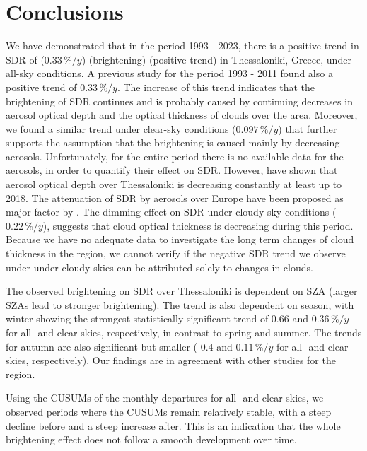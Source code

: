 \documentclass[applsci,article,submit,moreauthors,pdftex]{Definitions/mdpi}
\begin{document}
\hypertarget{conclusions}{%
\section{Conclusions}\label{conclusions}}

We have demonstrated that in the period 1993 - 2023, there is a positive
trend in SDR of (\(0.33\,\%/y\)) (brightening) (positive trend) in
Thessaloniki, Greece, under all-sky conditions. A previous study
\citep{Bais2013} for the period 1993 - 2011 found also a positive trend
of \(0.33\,\%/y\). The increase of this trend indicates that the
brightening of SDR continues and is probably caused by continuing
decreases in aerosol optical depth and the optical thickness of clouds
over the area. Moreover, we found a similar trend under clear-sky
conditions (\(0.097\,\%/y\)) that further supports the assumption that
the brightening is caused mainly by decreasing aerosols. Unfortunately,
for the entire period there is no available data for the aerosols, in
order to quantify their effect on SDR. However, \citet{Siomos2020} have
shown that aerosol optical depth over Thessaloniki is decreasing
constantly at least up to 2018. The attenuation of SDR by aerosols over
Europe have been proposed as major factor by \citet{Wild2021}. The
dimming effect on SDR under cloudy-sky conditions (\(0.22\,\%/y\)),
suggests that cloud optical thickness is decreasing during this period.
Because we have no adequate data to investigate the long term changes of
cloud thickness in the region, we cannot verify if the negative SDR
trend we observe under under cloudy-skies can be attributed solely to
changes in clouds.

The observed brightening on SDR over Thessaloniki is dependent on SZA
(larger SZAs lead to stronger brightening). The trend is also dependent
on season, with winter showing the strongest statistically significant
trend of \(0.66\) and \(0.36\,\%/y\) for all- and clear-skies,
respectively, in contrast to spring and summer. The trends for autumn
are also significant but smaller ( \(0.4\) and \(0.11\,\%/y\) for all-
and clear-skies, respectively). Our findings are in agreement with other
studies for the region.

Using the CUSUMs of the monthly departures for all- and clear-skies, we
observed periods where the CUSUMs remain relatively stable, with a steep
decline before and a steep increase after. This is an indication that
the whole brightening effect does not follow a smooth development over
time.
\end{document}
